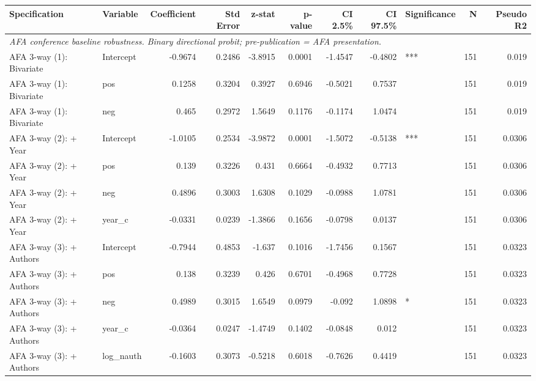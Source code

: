 \begin{tabular}{llrrrrrrlrr}
\toprule
Specification & Variable & Coefficient & Std Error & z-stat & p-value & CI 2.5\% & CI 97.5\% & Significance & N & Pseudo R2 \\
\midrule
\multicolumn{11}{l}{\textit{AFA conference baseline robustness. Binary directional probit; pre-publication = AFA presentation.}} \\[2pt]
AFA 3-way (1): Bivariate & Intercept & -0.9674 & 0.2486 & -3.8915 & 0.0001 & -1.4547 & -0.4802 & *** & 151 & 0.019 \\
AFA 3-way (1): Bivariate & pos & 0.1258 & 0.3204 & 0.3927 & 0.6946 & -0.5021 & 0.7537 &  & 151 & 0.019 \\
AFA 3-way (1): Bivariate & neg & 0.465 & 0.2972 & 1.5649 & 0.1176 & -0.1174 & 1.0474 &  & 151 & 0.019 \\
AFA 3-way (2): + Year & Intercept & -1.0105 & 0.2534 & -3.9872 & 0.0001 & -1.5072 & -0.5138 & *** & 151 & 0.0306 \\
AFA 3-way (2): + Year & pos & 0.139 & 0.3226 & 0.431 & 0.6664 & -0.4932 & 0.7713 &  & 151 & 0.0306 \\
AFA 3-way (2): + Year & neg & 0.4896 & 0.3003 & 1.6308 & 0.1029 & -0.0988 & 1.0781 &  & 151 & 0.0306 \\
AFA 3-way (2): + Year & year_c & -0.0331 & 0.0239 & -1.3866 & 0.1656 & -0.0798 & 0.0137 &  & 151 & 0.0306 \\
AFA 3-way (3): + Authors & Intercept & -0.7944 & 0.4853 & -1.637 & 0.1016 & -1.7456 & 0.1567 &  & 151 & 0.0323 \\
AFA 3-way (3): + Authors & pos & 0.138 & 0.3239 & 0.426 & 0.6701 & -0.4968 & 0.7728 &  & 151 & 0.0323 \\
AFA 3-way (3): + Authors & neg & 0.4989 & 0.3015 & 1.6549 & 0.0979 & -0.092 & 1.0898 & * & 151 & 0.0323 \\
AFA 3-way (3): + Authors & year_c & -0.0364 & 0.0247 & -1.4749 & 0.1402 & -0.0848 & 0.012 &  & 151 & 0.0323 \\
AFA 3-way (3): + Authors & log_nauth & -0.1603 & 0.3073 & -0.5218 & 0.6018 & -0.7626 & 0.4419 &  & 151 & 0.0323 \\
\bottomrule
\end{tabular}
